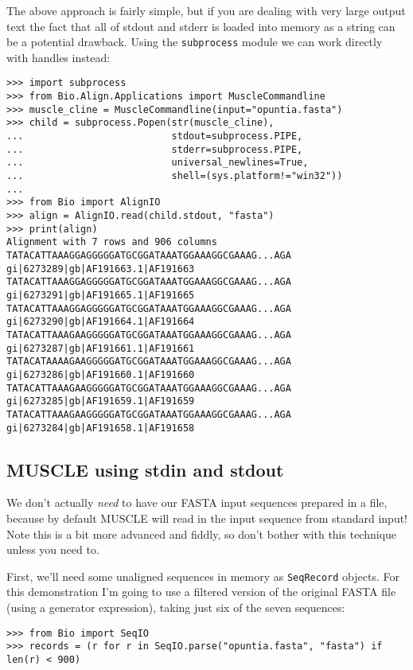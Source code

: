 The above approach is fairly simple, but if you are dealing with very large output
text the fact that all of stdout and stderr is loaded into memory as a string can
be a potential drawback. Using the \verb|subprocess| module we can work directly
with handles instead:

\begin{verbatim}
>>> import subprocess
>>> from Bio.Align.Applications import MuscleCommandline
>>> muscle_cline = MuscleCommandline(input="opuntia.fasta")
>>> child = subprocess.Popen(str(muscle_cline),
...                          stdout=subprocess.PIPE,
...                          stderr=subprocess.PIPE,
...                          universal_newlines=True,
...                          shell=(sys.platform!="win32"))
...
>>> from Bio import AlignIO
>>> align = AlignIO.read(child.stdout, "fasta")
>>> print(align)
Alignment with 7 rows and 906 columns
TATACATTAAAGGAGGGGGATGCGGATAAATGGAAAGGCGAAAG...AGA gi|6273289|gb|AF191663.1|AF191663
TATACATTAAAGGAGGGGGATGCGGATAAATGGAAAGGCGAAAG...AGA gi|6273291|gb|AF191665.1|AF191665
TATACATTAAAGGAGGGGGATGCGGATAAATGGAAAGGCGAAAG...AGA gi|6273290|gb|AF191664.1|AF191664
TATACATTAAAGAAGGGGGATGCGGATAAATGGAAAGGCGAAAG...AGA gi|6273287|gb|AF191661.1|AF191661
TATACATAAAAGAAGGGGGATGCGGATAAATGGAAAGGCGAAAG...AGA gi|6273286|gb|AF191660.1|AF191660
TATACATTAAAGAAGGGGGATGCGGATAAATGGAAAGGCGAAAG...AGA gi|6273285|gb|AF191659.1|AF191659
TATACATTAAAGAAGGGGGATGCGGATAAATGGAAAGGCGAAAG...AGA gi|6273284|gb|AF191658.1|AF191658
\end{verbatim}

\subsection{MUSCLE using stdin and stdout}

We don't actually \emph{need} to have our FASTA input sequences prepared in a file,
because by default MUSCLE will read in the input sequence from standard input!
Note this is a bit more advanced and fiddly, so don't bother with this technique
unless you need to.

First, we'll need some unaligned sequences in memory as \verb|SeqRecord| objects.
For this demonstration I'm going to use a filtered version of the original FASTA
file (using a generator expression), taking just six of the seven sequences:

\begin{verbatim}
>>> from Bio import SeqIO
>>> records = (r for r in SeqIO.parse("opuntia.fasta", "fasta") if len(r) < 900)
\end{verbatim}


